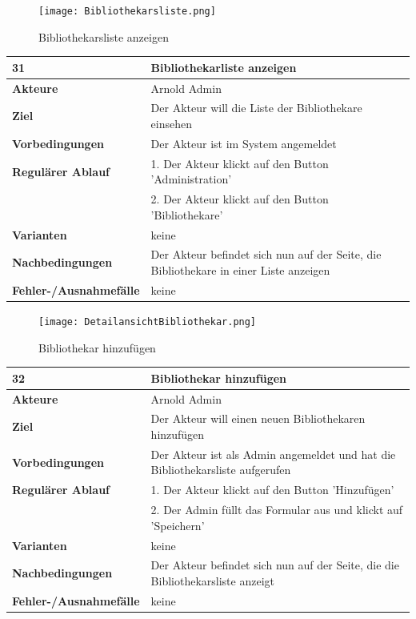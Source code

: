 \documentclass[fontsize=12pt,paper=a4,twoside]{scrartcl}
\begin{document}
\begin{figure}
	[H] \caption{Bibliothekarsliste anzeigen} 
	\texttt{[image: Bibliothekarsliste.png]} \label{pic:Bibs} 
\end{figure}
\begin{table}
	[H] \label{31} 
	\begin{tabular}
		{|l|p{10cm}|} \hline \textbf{31} & \textbf{Bibliothekarliste anzeigen} \\
		\hline \textbf{Akteure} & Arnold Admin\\
		\hline \textbf{Ziel} & Der Akteur will die Liste der Bibliothekare einsehen \\
		\hline \textbf{Vorbedingungen} & Der Akteur ist im System angemeldet \\
		\hline \textbf{Regulärer Ablauf} & 1. Der Akteur klickt auf den Button 'Administration' \\
		&2. Der Akteur klickt auf den Button 'Bibliothekare'\\
		\hline \textbf{Varianten} & keine \\
		\hline \textbf{Nachbedingungen} & Der Akteur befindet sich nun auf der Seite, die Bibliothekare in einer Liste anzeigen\\
		\hline \textbf{Fehler-/Ausnahmefälle} & keine\\
		\hline 
	\end{tabular}
\end{table}
\begin{figure}
	[H] \caption{Bibliothekar hinzufügen} 
	\texttt{[image: DetailansichtBibliothekar.png]} \label{pic:BibHinzufuegen} 
\end{figure}
\begin{table}
	[H] \label{32} 
	\begin{tabular}
		{|l|p{10cm}|} \hline \textbf{32} & \textbf{Bibliothekar hinzufügen} \\
		\hline \textbf{Akteure} & Arnold Admin\\
		\hline \textbf{Ziel} & Der Akteur will einen neuen Bibliothekaren hinzufügen \\
		\hline \textbf{Vorbedingungen} & Der Akteur ist als Admin angemeldet und hat die Bibliothekarsliste aufgerufen \\
		\hline \textbf{Regulärer Ablauf} & 1. Der Akteur klickt auf den Button 'Hinzufügen' \\
		&2. Der Admin füllt das Formular aus und klickt auf 'Speichern'\\
		\hline \textbf{Varianten} & keine \\
		\hline \textbf{Nachbedingungen} & Der Akteur befindet sich nun auf der Seite, die die Bibliothekarsliste anzeigt\\
		\hline \textbf{Fehler-/Ausnahmefälle} & keine\\
		\hline 
	\end{tabular}
\end{table}
\end{document}

